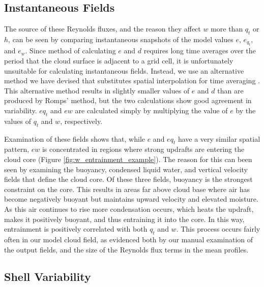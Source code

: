 \documentclass[draft,grl]{agutex}
\begin{document}
\begin{article}
\subsection{Instantaneous Fields}

The source of these Reynolds fluxes, and the reason they affect $w$ more than 
$q_t$ or $h$, can be seen by comparing instantaneous snapshots of the model 
values $e$, $e_{q_t}$, and $e_w$.  Since \cite{Romps2010} method of calculating 
$e$ and $d$ requires long time averages over the period that the cloud surface
is adjacent to a grid cell, it is unfortunately unsuitable for calculating 
instantaneous fields.  Instead, we use an alternative method we have devised 
that substitutes spatial interpolation for time averaging \citep{Dawe2011}.  
This alternative method results in slightly smaller values of $e$ and $d$ than 
are produced by Romps' method, but the two calculations show good agreement in 
variability. $eq_t$ and $ew$ are calculated simply by multiplying the value 
of $e$ by the values of $q_t$ and $w$, respectively.

Examination of these fields shows that, while $e$ and $eq_t$ have a very 
similar spatial pattern, $ew$ is concentrated in regions where strong updrafts 
are entering the cloud core (Figure \ref{fig:w_entrainment_example}).  The 
reason for this can been seen by examining the buoyancy, condensed liquid water,
and vertical velocity fields that define the cloud core.  Of these three
fields, buoyancy is the strongest constraint on the core.  This results in 
areas far above cloud base where air has become negatively buoyant but 
maintains upward velocity and elevated moisture.  As this air continues to 
rise more condensation occurs, which heats the updraft, makes it positively 
buoyant, and thus entraining it into the core.  In this way, entrainment is 
positively correlated with both $q_t$ and $w$.  This process occurs fairly 
often in our model cloud field, as evidenced both by our manual examination of 
the output fields, and the size of the Reynolds flux terms in the mean 
profiles.


\subsection{Shell Variability}


\end{article}
\end{document}

